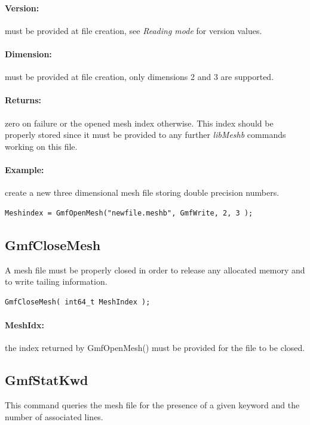\documentclass[a4paper,12pt]{article}
\begin{document}
\paragraph{Version:}
must be provided at file creation, see \emph{Reading mode} for version values.

\paragraph{Dimension:}
must be provided at file creation, only dimensions 2 and 3 are supported.

\paragraph{Returns:}
zero on failure or the opened mesh index otherwise. This index should be properly stored since it must be provided to any further \emph{libMeshb} commands working on this file.

\paragraph{Example:} create a new three dimensional mesh file storing double precision numbers.

\begin{tt}
\begin{verbatim}
Meshindex = GmfOpenMesh("newfile.meshb", GmfWrite, 2, 3 );
\end{verbatim}
\end{tt}
\normalfont


\subsection{GmfCloseMesh}
A mesh file must be properly closed in order to release any allocated memory and to write tailing information.

\begin{tt}
\begin{verbatim}
GmfCloseMesh( int64_t MeshIndex );
\end{verbatim}
\end{tt}
\normalfont

\paragraph{MeshIdx:}
the index returned by GmfOpenMesh() must be provided for the file to be closed.


\subsection{GmfStatKwd}
This command queries the mesh file for the presence of a given keyword and the number of associated lines.
\end{document}
